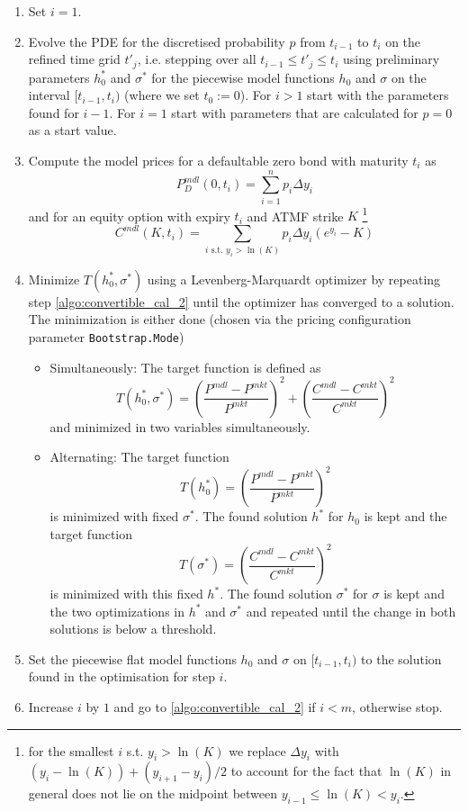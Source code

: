 \begin{enumerate}
\item Set $i=1$.
\item \label{algo:convertible_cal_2} Evolve the PDE for the discretised probability $p$ from $t_{i-1}$ to $t_i$ on the
  refined time grid $t'_j$, i.e. stepping over all $t_{i-1} \leq t'_j \leq t_i$ using preliminary parameters $h_0^*$ and
  $\sigma^*$ for the piecewise model functions $h_0$ and $\sigma$ on the interval $[t_{i-1}, t_i)$ (where we set
  $t_0 :=0$). For $i>1$ start with the parameters found for $i-1$. For $i=1$ start with parameters that are calculated
  for $p=0$ as a start value.
\item Compute the model prices for a defaultable zero bond with maturity $t_i$ as
  $$P^{mdl}_D(0,t_i) = \sum_{i=1}^n p_i \Delta y_i$$
  and for an equity option with expiry $t_i$ and ATMF strike $K$ \footnote{for the smallest $i$ s.t. $y_i>\ln(K)$ we
    replace $\Delta y_i$ with $(y_i - \ln(K)) + (y_{i+1}-y_i) / 2$ to account for the fact that $\ln(K)$ in general does
    not lie on the midpoint between $y_{i-1} \leq \ln(K) < y_i$.}
  $$C^{mdl}(K,t_i) = \sum_{i \text{ s.t. } y_i > \ln(K)} p_i \Delta y_i ( e^{y_i} - K) $$
\item Minimize $T(h_0^*,\sigma^*)$ using a Levenberg-Marquardt optimizer by repeating step \ref{algo:convertible_cal_2}
  until the optimizer has converged to a solution. The minimization is either done (chosen via the pricing configuration
  parameter \verb+Bootstrap.Mode+)
  \begin{itemize}
  \item Simultaneously: The target function is defined as
    $$T(h_0^*,\sigma^*) = \left( \frac{P^{mdl} - P^{mkt}}{P^{mkt}} \right)^2  + \left( \frac{C^{mdl} - C^{mkt}}{C^{mkt}} \right)^2$$
    and minimized in two variables simultaneously.
  \item Alternating: The target function
    $$T(h_0^*) = \left( \frac{P^{mdl} - P^{mkt}}{P^{mkt}} \right)^2$$
  is minimized with fixed $\sigma^*$. The found solution $h^*$ for $h_0$ is kept and the target function
    $$T(\sigma^*) = \left( \frac{C^{mdl} - C^{mkt}}{C^{mkt}} \right)^2$$
    is minimized with this fixed $h^*$. The found solution $\sigma^*$ for $\sigma$ is kept and the two optimizations in
    $h^*$ and $\sigma^*$ and repeated until the change in both solutions is below a threshold.
  \end{itemize}
\item Set the piecewise flat model functions $h_0$ and $\sigma$ on $[t_{i-1},t_i)$ to the solution found in the
  optimisation for step $i$.
\item Increase $i$ by $1$ and go to \ref{algo:convertible_cal_2} if $i<m$, otherwise stop.
\end{enumerate}

